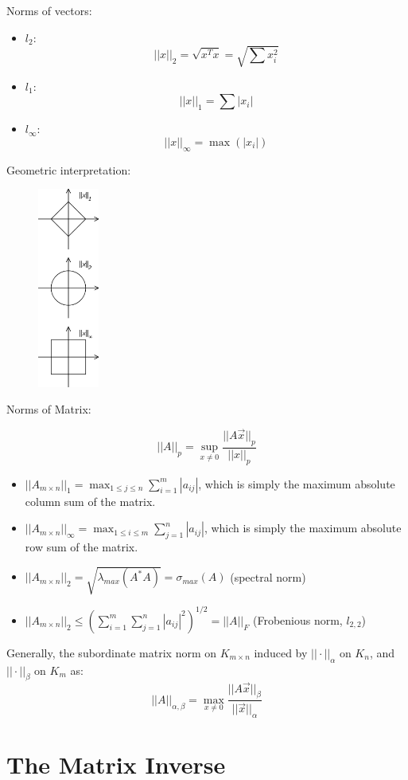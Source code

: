 \documentclass[letterpaper,10pt]{article}
\begin{document}
Norms of vectors:
\begin{itemize}
	\item $l_2$: $$||x||_2=\sqrt{x^Tx}=\sqrt{\sum{x_i^2}}$$
	\item $l_1$: $$||x||_1=\sum|x_i|$$
	\item $l_\infty$: $$||x||_\infty=\max(|x_i|)$$
\end{itemize}

Geometric interpretation:
\begin{figure}[!h]
	\centering
	\includegraphics[width=2cm]{./img/norms.png}
\end{figure}

Norms of Matrix:

$$||A||_p=\sup_{x\neq0}\frac{||A\vec{x}||_p}{||x||_p}$$
\begin{itemize}
	\item $||A_{m\times n}||_1=\max_{1\leq j \leq n}\sum_{i=1}^{m}|a_{ij}|$, which is simply the maximum absolute column sum of the matrix.
	\item $||A_{m\times n}||_\infty=\max_{1\leq i \leq m}\sum_{j=1}^{n}|a_{ij}|$, which is simply the maximum absolute row sum of the matrix.
	\item $||A_{m\times n}||_2 = \sqrt{\lambda_{max}(A^*A)}=\sigma_{max}(A)$ (spectral norm)
	\item $||A_{m\times n}||_2 \leq (\sum_{i=1}^{m}\sum_{j=1}^{n}|a_{ij}|^2)^{1/2}=||A||_F$ (Frobenious norm, $l_{2,2}$)
\end{itemize}
Generally, the subordinate matrix norm on $K_{m\times n}$ induced by $||\cdot||_\alpha$ on $K_n$, and $||\cdot||_\beta$ on $K_m$ as: $$||A||_{\alpha,\beta}=\max_{x\neq 0}\frac{||A\vec{x}||_\beta}{||\vec{x}||_\alpha}$$


\section{The Matrix Inverse}
\end{document}
